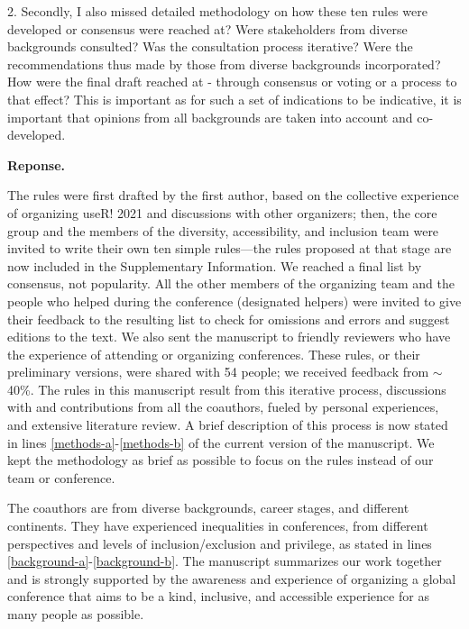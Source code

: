 \documentclass{article}
\newenvironment{Reply}{\noindent\color{BlueViolet}\textbf{Reponse.}}{\vspace{1em}}
\begin{document}
2. Secondly, I also missed detailed methodology on how these ten rules were developed or consensus were reached at? Were stakeholders from diverse backgrounds consulted? Was the consultation process iterative? Were the recommendations thus made by those from diverse backgrounds incorporated? How were the final draft reached at - through consensus or voting or a process to that effect? This is important as for such a set of indications to be indicative, it is important that opinions from all backgrounds are taken into account and co-developed.

\begin{Reply}

    The rules were first drafted by the first author, based on the collective experience of organizing useR! 2021 and discussions with other organizers; then, the core group and the members of the diversity, accessibility, and inclusion team were invited to write their own ten simple rules—the rules proposed at that stage are now included in the Supplementary Information.
    We reached a final list by consensus, not popularity. All the other members of the organizing team and the people who helped during the conference (designated helpers) were invited to give their feedback to the resulting list to check for omissions and errors and suggest editions to the text.
    We also sent the manuscript to friendly reviewers who have the experience of attending or organizing conferences. 
    These rules, or their preliminary versions, were shared with 54 people; we received feedback from $\sim$40\%.
    The rules in this manuscript result from this iterative process, discussions with and contributions from all the coauthors, fueled by personal experiences, and extensive literature review.
    A brief description of this process is now stated in lines \ref{methods-a}-\ref{methods-b} of the current version of the manuscript.
    We kept the methodology as brief as possible to focus on the rules instead of our team or conference. 
    
    The coauthors are from diverse backgrounds, career stages, and different continents. They have experienced inequalities in conferences, from different perspectives and levels of inclusion/exclusion and privilege, as stated in lines \ref{background-a}-\ref{background-b}.
    The manuscript summarizes our work together and is strongly supported by the awareness and experience of organizing a global conference that aims to be a kind, inclusive, and accessible experience for as many people as possible.
\end{Reply}
\end{document}
